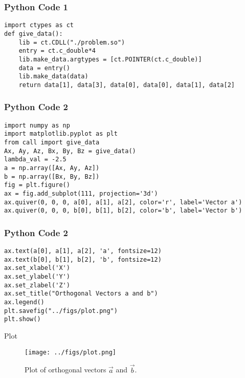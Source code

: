 \documentclass{beamer}
\begin{document}
\begin{frame}[fragile]
    \frametitle{Python Code 1}
    \begin{lstlisting}
import ctypes as ct
def give_data():
    lib = ct.CDLL("./problem.so")
    entry = ct.c_double*4
    lib.make_data.argtypes = [ct.POINTER(ct.c_double)]
    data = entry()
    lib.make_data(data)
    return data[1], data[3], data[0], data[0], data[1], data[2]
    \end{lstlisting}
\end{frame}

\begin{frame}[fragile]
    \frametitle{Python Code 2}
    \begin{lstlisting}
import numpy as np
import matplotlib.pyplot as plt
from call import give_data
Ax, Ay, Az, Bx, By, Bz = give_data()
lambda_val = -2.5
a = np.array([Ax, Ay, Az])   
b = np.array([Bx, By, Bz])   
fig = plt.figure()
ax = fig.add_subplot(111, projection='3d')
ax.quiver(0, 0, 0, a[0], a[1], a[2], color='r', label='Vector a')
ax.quiver(0, 0, 0, b[0], b[1], b[2], color='b', label='Vector b')
    \end{lstlisting}
\end{frame}

\begin{frame}[fragile]
    \frametitle{Python Code 2}
    \begin{lstlisting}
ax.text(a[0], a[1], a[2], 'a', fontsize=12)
ax.text(b[0], b[1], b[2], 'b', fontsize=12)
ax.set_xlabel('X')
ax.set_ylabel('Y')
ax.set_zlabel('Z')
ax.set_title("Orthogonal Vectors a and b")
ax.legend()
plt.savefig("../figs/plot.png")
plt.show()
    \end{lstlisting}
\end{frame}

\begin{frame}{Plot}
    \begin{figure}
        \centering
        \texttt{[image: ../figs/plot.png]}
        \caption{Plot of orthogonal vectors $\vec{a}$ and $\vec{b}$.}
        \label{fig:fig}
    \end{figure}
\end{frame}
\end{document}
